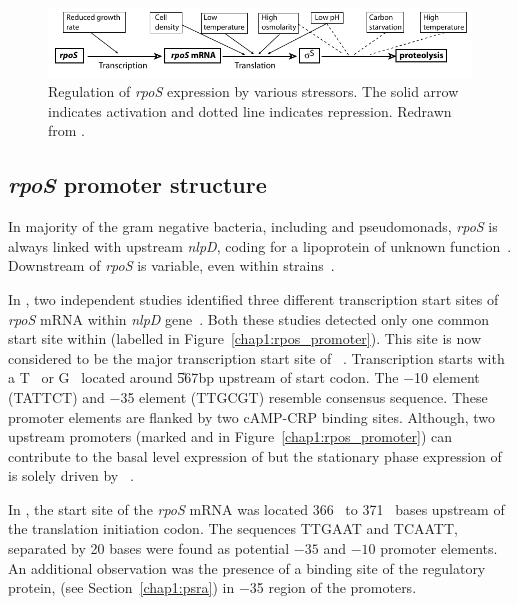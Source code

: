 \begin{figure}[tbp]
\begin{narrow}{-1in}{-1in}
\centering
\includegraphics{figures/chap1_rpos_control}
\end{narrow}
\caption[Regulation of \emph{rpoS} expression]{Regulation of
\emph{rpoS} expression by various stressors. The solid arrow
indicates activation and dotted line indicates repression. Redrawn
from \citet{Hengge2002}.} \label{intro_rpos_control}
\end{figure}


\subsection{\emph{rpoS} promoter structure}

In majority of the gram negative bacteria, including  and
pseudomonads, \emph{rpoS} is always linked with upstream
\emph{nlpD}, coding for a lipoprotein of unknown
function~\citep{Ichikawa1994,Lange1994b}. Downstream of
\emph{rpoS} is variable, even within 
strains~\citep{Brown2001,Herbelin2000}.

In , two independent studies identified three different
transcription start sites of \emph{rpoS} mRNA within \emph{nlpD}
gene~\citep{Lange1995,Takayanagi1994}. Both these studies detected
only one common  start site within  (labelled
 in Figure~\ref{chap1:rpos_promoter}). This site is now
considered to be the major transcription start site of
~\citep{Hengge2002}. Transcription starts with a
T~\citep{Takayanagi1994} or G~\citep{Lange1995} located around
\U{567}{bp} upstream of  start codon. The $-$10 element
(TATTCT) and $-$35 element (TTGCGT) resemble \siga{} consensus
sequence. These promoter elements are flanked by two cAMP-CRP
binding sites. Although, two upstream  promoters (marked
 and  in Figure~\ref{chap1:rpos_promoter}) can
contribute to the basal level expression of  but the
stationary phase expression of  is solely driven by
~\citep{Lange1995,Takayanagi1994}.

In , the start site of the \emph{rpoS} mRNA was
located 366~\citep{Tanaka1994} to 371~\citep{Kojic2002} bases
upstream of the translation initiation codon. The sequences TTGAAT
and TCAATT, separated by 20 bases were found as potential $-35$
and $-10$ promoter elements. An additional observation was the
presence of a binding site of the regulatory protein, 
(see Section~\ref{chap1:psra}) in $-$35 region of the promoters.


